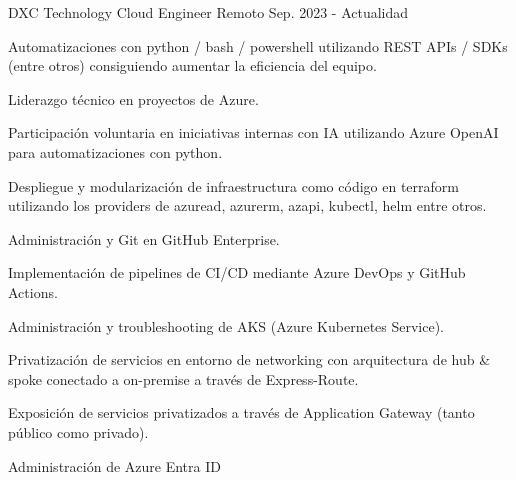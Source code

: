 

\begin{cventries}

  \cventry
    {DXC Technology} %
    {Cloud Engineer} %
    {Remoto} %
    {Sep. 2023 - Actualidad} %
    {
      \begin{cvitems} %
        \item {Automatizaciones con python / bash / powershell utilizando REST APIs / SDKs (entre otros) consiguiendo aumentar la eficiencia del equipo.}
        \item {Liderazgo técnico en proyectos de Azure}.
        \item {Participación voluntaria en iniciativas internas con IA utilizando Azure OpenAI para automatizaciones con python}.
        \item {Despliegue y modularización de infraestructura como código en terraform utilizando los providers de azuread, azurerm, azapi, kubectl, helm entre otros.}
        \item {Administración y Git en GitHub Enterprise.}
        \item {Implementación de pipelines de CI/CD mediante Azure DevOps y GitHub Actions.}
        \item {Administración y troubleshooting de AKS (Azure Kubernetes Service).}
        \item {Privatización de servicios en entorno de networking con arquitectura de hub \& spoke conectado a on-premise a través de Express-Route.}
        \item {Exposición de servicios privatizados a través de Application Gateway (tanto público como privado).}
        \item {Administración de Azure Entra ID}
      \end{cvitems}
    }


\end{cventries}
